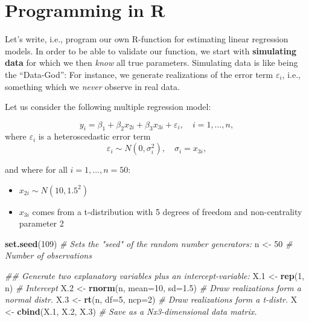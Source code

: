 \documentclass[]{book}
\newenvironment{Shaded}{\begin{snugshade}}{\end{snugshade}}
\newcommand{\CommentTok}[1]{\textcolor[rgb]{0.56,0.35,0.01}{\textit{#1}}}
\newcommand{\DataTypeTok}[1]{\textcolor[rgb]{0.13,0.29,0.53}{#1}}
\newcommand{\DecValTok}[1]{\textcolor[rgb]{0.00,0.00,0.81}{#1}}
\newcommand{\FloatTok}[1]{\textcolor[rgb]{0.00,0.00,0.81}{#1}}
\newcommand{\KeywordTok}[1]{\textcolor[rgb]{0.13,0.29,0.53}{\textbf{#1}}}
\newcommand{\NormalTok}[1]{#1}
\newcommand{\StringTok}[1]{\textcolor[rgb]{0.31,0.60,0.02}{#1}}
\providecommand{\tightlist}{%
  \setlength{\itemsep}{0pt}\setlength{\parskip}{0pt}}
\theoremstyle{definition}
\theoremstyle{definition}
\theoremstyle{definition}
\theoremstyle{remark}
\begin{document}
\hypertarget{programming-in-r}{%
\section{Programming in R}\label{programming-in-r}}

Let's write, i.e., program our own R-function for estimating linear regression models. In order to be able to validate our function, we start with \textbf{simulating data} for which we then \emph{know} all true parameters. Simulating data is like being the ``Data-God'': For instance, we generate realizations of the error term \(\varepsilon_i\), i.e., something which we \emph{never} observe in real data.

Let us consider the following multiple regression model:

\[y_i=\beta_1 +\beta_2 x_{2i}+\beta_3 x_{3i}+\varepsilon_{i},\quad i=1,\dots,n,\]
where \(\varepsilon_{i}\) is a heteroscedastic error term
\[\varepsilon_{i}\sim N(0,\sigma_i^2),\quad \sigma_i=x_{3i},\]

and where for all \(i=1,\dots,n=50\):

\begin{itemize}
\tightlist
\item
  \(x_{2i}\sim N(10,1.5^2)\)
\item
  \(x_{3i}\) comes from a t-distribution with 5 degrees of freedom and non-centrality parameter 2
\end{itemize}

\begin{Shaded}
\begin{Highlighting}[]
\KeywordTok{set.seed}\NormalTok{(}\DecValTok{109}\NormalTok{) }\CommentTok{# Sets the "seed" of the random number generators:}
\NormalTok{n   <-}\StringTok{ }\DecValTok{50}     \CommentTok{# Number of observations}

\CommentTok{## Generate two explanatory variables plus an intercept-variable:}
\NormalTok{X}\FloatTok{.1}\NormalTok{ <-}\StringTok{ }\KeywordTok{rep}\NormalTok{(}\DecValTok{1}\NormalTok{, n)                 }\CommentTok{# Intercept}
\NormalTok{X}\FloatTok{.2}\NormalTok{ <-}\StringTok{ }\KeywordTok{rnorm}\NormalTok{(n, }\DataTypeTok{mean=}\DecValTok{10}\NormalTok{, }\DataTypeTok{sd=}\FloatTok{1.5}\NormalTok{) }\CommentTok{# Draw realizations form a normal distr.}
\NormalTok{X}\FloatTok{.3}\NormalTok{ <-}\StringTok{ }\KeywordTok{rt}\NormalTok{(n, }\DataTypeTok{df=}\DecValTok{5}\NormalTok{, }\DataTypeTok{ncp=}\DecValTok{2}\NormalTok{)        }\CommentTok{# Draw realizations form a t-distr.}
\NormalTok{X   <-}\StringTok{ }\KeywordTok{cbind}\NormalTok{(X}\FloatTok{.1}\NormalTok{, X}\FloatTok{.2}\NormalTok{, X}\FloatTok{.3}\NormalTok{)      }\CommentTok{# Save as a Nx3-dimensional data matrix.}
\end{Highlighting}
\end{Shaded}
\end{document}
